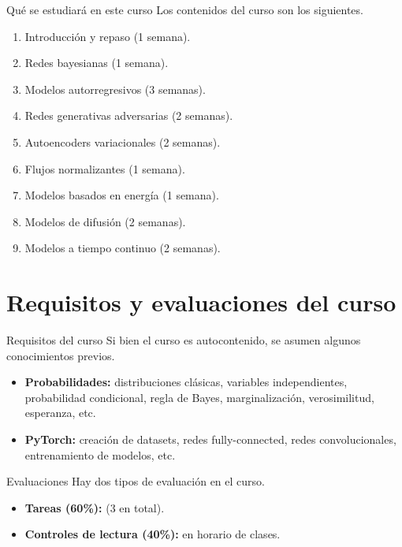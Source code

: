 \documentclass{beamer}
\begin{document}
\begin{frame}{Qué se estudiará en este curso}
    Los contenidos del curso son los siguientes.
    \begin{enumerate}
        \item<2> Introducción y repaso (1 semana).
        \item<3> Redes bayesianas (1 semana).
        \item<4> Modelos autorregresivos (3 semanas).
        \item<5> Redes generativas adversarias (2 semanas).
        \item<6> Autoencoders variacionales (2 semanas).
        \item<7> Flujos normalizantes (1 semana).
        \item<8> Modelos basados en energía (1 semana).
        \item<9> Modelos de difusión (2 semanas).
        \item<10> Modelos a tiempo continuo (2 semanas).

    \end{enumerate}
\end{frame}

\section{Requisitos y evaluaciones del curso}

\begin{frame}{Requisitos del curso}
    Si bien el curso es autocontenido, se asumen algunos conocimientos previos.
    \begin{itemize}
        \item<2,4> \textbf{Probabilidades:} distribuciones clásicas, variables independientes, probabilidad condicional, regla de Bayes, marginalización, verosimilitud, esperanza, etc.
        \item<3,4> \textbf{PyTorch:} creación de datasets, redes fully-connected, redes convolucionales, entrenamiento de modelos, etc.
    \end{itemize}
\end{frame}

\begin{frame}{Evaluaciones}
    Hay dos tipos de evaluación en el curso.
    \begin{itemize}
        \item<2,4> \textbf{Tareas (60\%):} (3 en total).
        \item<3,4> \textbf{Controles de lectura (40\%):} en horario de clases.
    \end{itemize}
\end{frame}
\end{document}
